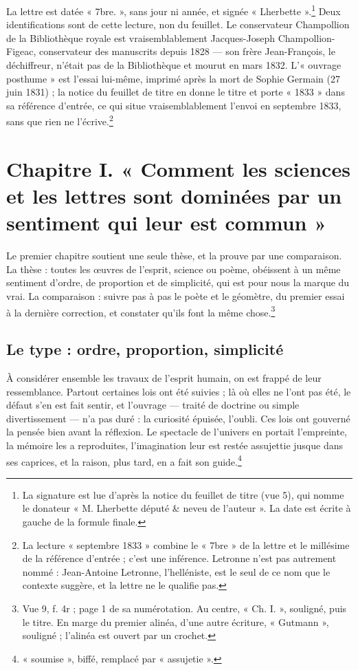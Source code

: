 \documentclass[11pt,a4paper]{article}
\begin{document}
La lettre est datée « 7bre. », sans jour ni année, et signée
« Lherbette ».\footnote{La signature est lue d'après la notice du feuillet de
titre (vue 5), qui nomme le donateur « M. Lherbette député \& neveu de
l'auteur ». La date est écrite à gauche de la formule finale.} Deux
identifications sont de cette lecture, non du feuillet. Le conservateur
Champollion de la Bibliothèque royale est vraisemblablement Jacques-Joseph
Champollion-Figeac, conservateur des manuscrits depuis 1828 — son frère
Jean-François, le déchiffreur, n'était pas de la Bibliothèque et mourut en mars
1832. L'« ouvrage posthume » est l'essai lui-même, imprimé après la mort de
Sophie Germain (27 juin 1831) ; la notice du feuillet de titre en donne le
titre et porte « 1833 » dans sa référence d'entrée, ce qui situe vraisemblablement
l'envoi en septembre 1833, sans que rien ne l'écrive.\footnote{La lecture
« septembre 1833 » combine le « 7bre » de la lettre et le millésime de la
référence d'entrée ; c'est une inférence. Letronne n'est pas autrement nommé :
Jean-Antoine Letronne, l'helléniste, est le seul de ce nom que le contexte
suggère, et la lettre ne le qualifie pas.}

\section*{Chapitre I. « Comment les sciences et les lettres sont dominées par un sentiment qui leur est commun »}

Le premier chapitre soutient une seule thèse, et la prouve par une
comparaison. La thèse : toutes les œuvres de l'esprit, science ou poème,
obéissent à un même sentiment d'ordre, de proportion et de simplicité, qui est
pour nous la marque du vrai. La comparaison : suivre pas à pas le poète et le
géomètre, du premier essai à la dernière correction, et constater qu'ils font
la même chose.\footnote{Vue 9, f. 4r ; page 1 de sa numérotation. Au centre,
« Ch. I. », souligné, puis le titre. En marge du premier alinéa, d'une autre
écriture, « Gutmann », souligné ; l'alinéa est ouvert par un crochet.}

\subsection*{Le type : ordre, proportion, simplicité}

À considérer ensemble les travaux de l'esprit humain, on est frappé de leur
ressemblance. Partout certaines lois ont été suivies ; là où elles ne l'ont
pas été, le défaut s'en est fait sentir, et l'ouvrage — traité de doctrine ou
simple divertissement — n'a pas duré : la curiosité épuisée, l'oubli. Ces lois
ont gouverné la pensée bien avant la réflexion. Le spectacle de l'univers en
portait l'empreinte, la mémoire les a reproduites, l'imagination leur est
restée assujettie jusque dans ses caprices, et la raison, plus tard, en a fait
son guide.\footnote{« soumise », biffé, remplacé par « assujetie ».}
\end{document}
